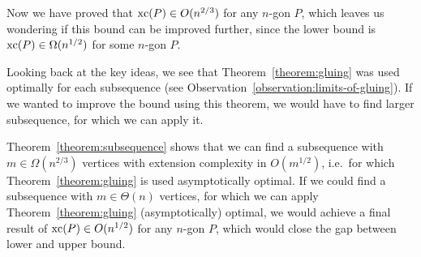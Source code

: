 Now we have proved that $\operatorname{xc}(P) \in O(n^{2/3})$ for any $n$-gon $P$, which leaves us wondering if this bound can be improved further, since the lower bound is $\operatorname{xc}(P) \in \Omega(n^{1/2})$ for some $n$-gon $P$.

Looking back at the key ideas, we see that Theorem~\ref{theorem:gluing} was used optimally for each subsequence (see Observation~\ref{observation:limits-of-gluing}). If we wanted to improve the bound using this theorem, we would have to find larger subsequence, for which we can apply it.

Theorem~\ref{theorem:subsequence} shows that we can find a subsequence with $m \in \Omega(n^{2/3})$ vertices with extension complexity in $O(m^{1/2})$, i.e.\ for which Theorem~\ref{theorem:gluing} is used asymptotically optimal. If we could find a subsequence with $m \in \Theta(n)$ vertices, for which we can apply Theorem~\ref{theorem:gluing} (asymptotically) optimal, we would achieve a final result of $\operatorname{xc}(P) \in O(n^{1/2})$ for any $n$-gon $P$, which would close the gap between lower and upper bound.



